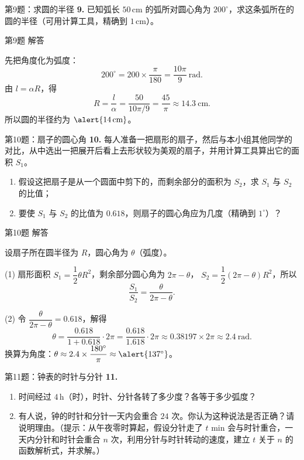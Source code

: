 \documentclass[10pt,aspectratio=169,serif]{beamer}
\begin{document}
\begin{frame}[t]{第9题：求圆的半径}
\textbf{9.} 已知弧长 $50\,\text{cm}$ 的弧所对圆心角为 $200^\circ$，求这条弧所在的圆的半径（可用计算工具，精确到 $1\,\text{cm}$）。
\end{frame}

\begin{frame}[t]{第9题 解答}
\begin{tcolorbox}[colback=orange!10,colframe=orange,title=\textbf{解}]
先把角度化为弧度：
\[
200^\circ = 200\times\frac{\pi}{180} = \frac{10\pi}{9}\ \text{rad}.
\]
由 $l=\alpha R$，得
\[
R = \frac{l}{\alpha} = \frac{50}{10\pi/9} = \frac{45}{\pi}\approx 14.3\ \text{cm}.
\]
所以圆的半径约为 $\alert{14\,\text{cm}}$。
\end{tcolorbox}
\end{frame}

\begin{frame}[t]{第10题：扇子的圆心角}
\textbf{10.} 每人准备一把扇形的扇子，然后与本小组其他同学的对比，从中选出一把展开后看上去形状较为美观的扇子，并用计算工具算出它的面积 $S_1$。
\begin{enumerate}
  \item 假设这把扇子是从一个圆面中剪下的，而剩余部分的面积为 $S_2$，求 $S_1$ 与 $S_2$ 的比值；
  \item 要使 $S_1$ 与 $S_2$ 的比值为 $0.618$，则扇子的圆心角应为几度（精确到 $1^\circ$）？
\end{enumerate}
\end{frame}

\begin{frame}[t]{第10题 解答}
\begin{tcolorbox}[colback=orange!10,colframe=orange,title=\textbf{解}]
设扇子所在圆半径为 $R$，圆心角为 $\theta$（弧度）。

(1) 扇形面积 $S_1=\dfrac{1}{2}\theta R^2$，剩余部分圆心角为 $2\pi-\theta$，
$S_2=\dfrac{1}{2}(2\pi-\theta)R^2$，所以
\[
\frac{S_1}{S_2} = \frac{\theta}{2\pi-\theta}.
\]

(2) 令 $\dfrac{\theta}{2\pi-\theta}=0.618$，解得
\[
\theta = \frac{0.618}{1+0.618}\cdot 2\pi = \frac{0.618}{1.618}\cdot 2\pi \approx 0.38197\times 2\pi \approx 2.4\ \text{rad}.
\]
换算为角度：$\theta\approx 2.4\times\dfrac{180^\circ}{\pi}\approx \alert{137^\circ}$。
\end{tcolorbox}
\end{frame}

\begin{frame}[t]{第11题：钟表的时针与分针}
\textbf{11.}
\begin{enumerate}
  \item 时间经过 $4\,\text{h}$（时），时针、分针各转了多少度？各等于多少弧度？
  \item 有人说，钟的时针和分针一天内会重合 $24$ 次。你认为这种说法是否正确？请说明理由。（提示：从午夜零时算起，假设分针走了 $t$ min 会与时针重合，一天内分针和时针会重合 $n$ 次，利用分针与时针转动的速度，建立 $t$ 关于 $n$ 的函数解析式，并求解。）
\end{enumerate}
\end{frame}
\end{document}
